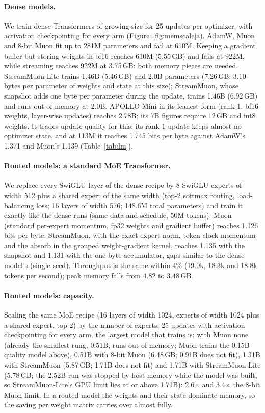 \documentclass[10pt]{article}
\newcommand{\method}{StreamMuon}\newcommand{\lite}{StreamMuon-Lite}
\begin{document}
\paragraph{Dense models.} We train dense Transformers of growing size for 25 updates per optimizer, with activation
checkpointing for every arm (Figure~\ref{fig:memscale}a). AdamW, Muon and 8-bit Muon fit up to 281M parameters and fail
at 610M. Keeping a gradient buffer but storing weights in bf16 reaches 610M (5.55\,GB) and fails at 922M, while streaming
reaches 922M at 3.75\,GB: both memory pieces are needed. \lite{} trains 1.46B (5.46\,GB) and 2.0B parameters (7.26\,GB; 3.10 bytes per
parameter of weights and state at this size); \method{}, whose snapshot adds one byte per parameter during the
update, trains 1.46B (6.92\,GB) and runs out of memory at 2.0B. APOLLO-Mini in its leanest form (rank 1, bf16 weights,
layer-wise updates) reaches 2.78B; its 7B figures require 12\,GB and int8 weights. It trades update quality for this:
its rank-1 update keeps almost no optimizer state, and at 113M it reaches 1.745 bits per byte against AdamW's 1.371
and Muon's 1.139 (Table~\ref{tab:lm}).

\paragraph{Routed models: a standard MoE Transformer.} We replace every SwiGLU layer of the dense recipe by 8 SwiGLU
experts of width 512 plus a shared expert of the same width (top-2 softmax routing, load-balancing loss; 16 layers of
width 576; 148.6M total parameters) and train it exactly like the dense runs (same data and schedule, 50M tokens).
Muon (standard per-expert momentum, fp32 weights and gradient buffer) reaches 1.126 bits per byte; \method{}, with
the exact expert norm, token-clock momentum and the absorb in the grouped weight-gradient kernel, reaches 1.135 with
the snapshot and 1.131 with the one-byte accumulator, gaps similar to the dense model's (single seed). Throughput
is the same within 4\% (19.0k, 18.3k and 18.8k tokens per second); peak memory falls from 4.82 to 3.48\,GB.

\paragraph{Routed models: capacity.} Scaling the same MoE recipe (16 layers of width 1024, experts of width 1024
plus a shared expert, top-2) by the number of experts, 25 updates with activation checkpointing for every arm, the
largest model that trains is: with Muon none (already the smallest rung, 0.51B, runs out of memory; Muon trains the
0.15B quality model above), 0.51B with 8-bit Muon
(6.48\,GB; 0.91B does not fit), 1.31B with \method{} (5.87\,GB; 1.71B does not fit) and 1.71B with \lite{} (5.78\,GB;
the 2.52B run was stopped by host memory while the model was built, so \lite{}'s GPU limit lies at or above 1.71B): 2.6$\times$ and 3.4$\times$ the 8-bit Muon limit. In a routed model the weights and their state
dominate memory, so the saving per weight matrix carries over almost fully.
\end{document}
